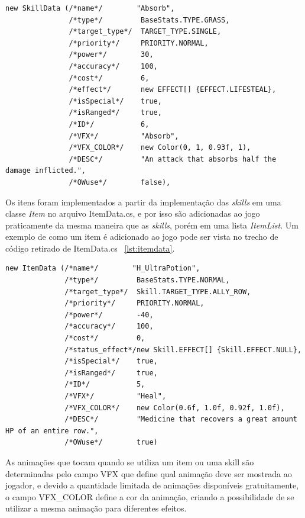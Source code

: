\documentclass[
	12pt,				%
	openright,			%
	twoside,			%
	a4paper,			%
	english,			%
	french,				%
	spanish,			%
	brazil				%
	]{abntex2}
\begin{document}
\begin{lstlisting}
new SkillData (/*name*/        "Absorb", 
               /*type*/         BaseStats.TYPE.GRASS, 
               /*target_type*/  TARGET_TYPE.SINGLE, 
               /*priority*/     PRIORITY.NORMAL, 
               /*power*/        30, 
               /*accuracy*/     100, 
               /*cost*/         6,
               /*effect*/       new EFFECT[] {EFFECT.LIFESTEAL}, 
               /*isSpecial*/    true, 
               /*isRanged*/     true,
               /*ID*/           6,
               /*VFX*/          "Absorb",
               /*VFX_COLOR*/    new Color(0, 1, 0.93f, 1),
               /*DESC*/         "An attack that absorbs half the damage inflicted.",
               /*OWuse*/        false),
\end{lstlisting}

	Os itens foram implementados a partir da implementação das \emph{skills} em uma classe \emph{Item} no arquivo ItemData.cs, e por isso são adicionadas ao jogo praticamente da mesma maneira que as \emph{skills}, porém em uma lista \emph{ItemList}. Um exemplo de como um item é adicionado ao jogo pode ser vista no trecho de código retirado de ItemData.cs ~\ref{lst:itemdata}.
	
\begin{lstlisting}
new ItemData (/*name*/        "H_UltraPotion", 
              /*type*/         BaseStats.TYPE.NORMAL, 
              /*target_type*/  Skill.TARGET_TYPE.ALLY_ROW, 
              /*priority*/     PRIORITY.NORMAL, 
              /*power*/        -40, 
              /*accuracy*/     100, 
              /*cost*/         0,
              /*status_effect*/new Skill.EFFECT[] {Skill.EFFECT.NULL}, 
              /*isSpecial*/    true, 
              /*isRanged*/     true,
              /*ID*/           5,
              /*VFX*/          "Heal",
              /*VFX_COLOR*/    new Color(0.6f, 1.0f, 0.92f, 1.0f),
              /*DESC*/         "Medicine that recovers a great amount HP of an entire row.",
              /*OWuse*/        true)
\end{lstlisting}

	As animações que tocam quando se utiliza um item ou uma skill são determinadas pelo campo VFX que define qual animação deve ser mostrada ao jogador, e devido a quantidade limitada de animações disponíveis gratuitamente, o campo VFX\_COLOR define a cor da animação, criando a possibilidade de se utilizar a mesma animação para diferentes efeitos.
\end{document}
